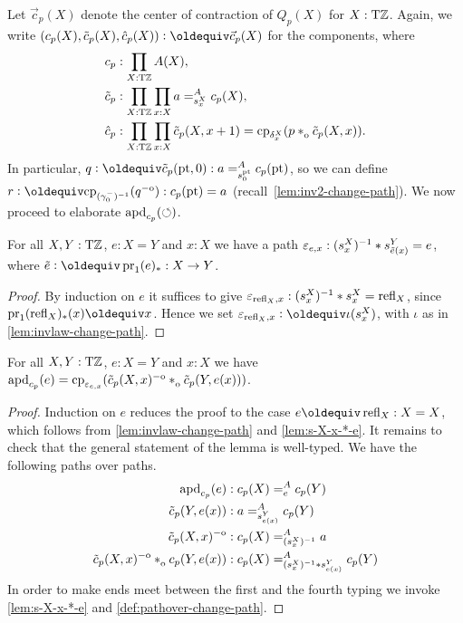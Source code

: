 \documentclass[a4paper,12pt]{amsart}
\begin{document}
Let $\vec c_p(X)$ denote the center of contraction of $Q_p(X)$ for $X:{\mathrm{T}\mathbb{Z}}$.
Again, we write $(c_p(X),\tilde{c}_p(X),\hat{c}_p(X))\defeq\vec{c}_p(X)$
for the components, where
\begin{align*}
         c_p &: \prod_{X:\TorZ} A(X),\\
  \tilde c_p &: \prod_{X:\TorZ}\prod_{x:X} a =^A_{s^X_x} c_p(X), \\
    \hat c_p &: \prod_{X:\TorZ}\prod_{x:X} \tilde c_p(X,x+1)
               = \cp{\delta^X_x}(p \cto \tilde c_p(X,x)).
\end{align*}
In particular, $q\defeq \tilde c_p(\pt,0) : a =^A_{s^\pt_0} c_p(\pt)$,
so we can define $r\defeq \cp{(\gamma_0^-)^{-1}}(q\invo) : c_p(\pt) = a$
(recall~\cref{lem:inv2-change-path}).
We now proceed to elaborate $\mathop{{\mathrm{apd}}_{c_p}}({\circlearrowleft})$.

\begin{lemma}\label{lem:s-X-x-*-e}
  For all $X,Y:{\mathrm{T}\mathbb{Z}}$, $e: X=Y$ and $x:X$ we have a path
  $\varepsilon_{e,x} : (s^X_x)^{-1} * s^Y_{\tilde {e}(x)} = e$,
  where $\ptoe{e}\defeq \pr_1(e)_* : X\to Y$.
\end{lemma}
\begin{proof}
By induction on $e$ it suffices to give
$\varepsilon_{\mathop{{\mathrm{refl}}_{X}},x} : (s^X_x)^{-1} * s^X_x = \mathop{{\mathrm{refl}}_{X}}$,
since $\pr_1(\refl{X})_*(x) \jdeq x$.
Hence we set $\varepsilon_{\refl{X},x} \defeq \iota(s^X_x)$,
with $\iota$ as in \cref{lem:invlaw-change-path}.
\end{proof}

\begin{lemma}\label{lem:apd-c-tilde-c}
For all $X,Y:{\mathrm{T}\mathbb{Z}}$, $e: X=Y$ and $x:X$ we have
$\apd{c_p}(e) = \cp{\varepsilon_{e,x}}
(\tilde c_p(X,x)\invo\cto \tilde c_p(Y,e(x)))$.
\end{lemma}
\begin{proof}
Induction on $e$ reduces the proof to the case $e\jdeq\refl{X}: X=X$,
which follows from \cref{lem:invlaw-change-path} and \cref{lem:s-X-x-*-e}.
It remains to check that the general statement of the lemma is well-typed.
We have the following paths over paths.
\begin{align*}
\apd{c_p}(e) &: c_p(X) =^A_e c_p(Y)\\
\tilde c_p(Y,e(x)) &:  a =^A_{s^Y_{e(x)}} c_p(Y)\\
\tilde c_p(X,x)\invo &: c_p(X) =^A_{(s^X_x)^{-1}} a\\
\tilde c_p(X,x)\invo \cto c_p(Y,e(x)) &:
     c_p(X) =^A_{(s^X_x)^{-1}\ct s^Y_{e(x)}} c_p(Y)
\end{align*}
In order to make ends meet between the first and the fourth typing
we invoke \cref{lem:s-X-x-*-e} and \cref{def:pathover-change-path}.
\end{proof}
\end{document}
